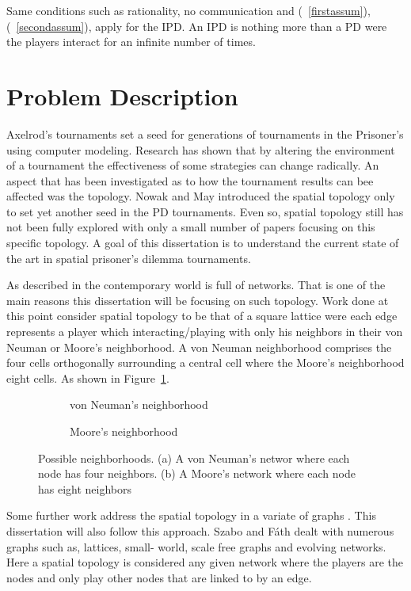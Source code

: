 Same conditions such as rationality, no communication and (~\ref{firstassum}),
(~\ref{secondassum}),
apply for the IPD. An IPD is nothing more than a PD were
the players interact for an infinite number of times.

\section{Problem Description}
Axelrod's tournaments set a seed for generations of tournaments in the
Prisoner's using computer modeling. Research has shown that by altering the
environment of a tournament the effectiveness of some strategies can change
radically. An aspect that has been investigated as to how the tournament results
can bee affected was the topology. Nowak and May \cite{Nowak1992} introduced the spatial topology
only to set yet another seed in the PD tournaments. Even so, spatial topology
still has not been fully explored with only a small number of papers focusing on
this specific topology.  A goal of this dissertation is to understand the
current state of the art in spatial prisoner’s dilemma tournaments.

As described in \cite{MacLane1971} the contemporary world is full of networks. That
is one of the main reasons this dissertation will be focusing on such topology.
Work done at this point consider spatial topology to be that of a square lattice
were each edge represents a player which interacting/playing with only his
neighbors in their von Neuman or Moore's neighborhood. A von Neuman neighborhood
comprises the four cells orthogonally surrounding a central cell where the
Moore's neighborhood eight cells. As shown in Figure~\ref{fig:neighborhood}.

\begin{figure}[!hbtp]
	\centering
	\begin{subfigure}[h]{0.45\textwidth}
		\centering
		
		\caption{von Neuman's neighborhood}
	\end{subfigure}
	\hfill
	\begin{subfigure}[h]{0.52\textwidth}\centering
		\centering
		
		\caption{Moore's neighborhood}
	\end{subfigure}
  \caption{Possible neighborhoods. (a) A von Neuman's networ where each node has four neighbors.
  (b) A Moore's network where each node has eight neighbors}
  \label{fig:neighborhood}
\end{figure}

Some further work address the spatial topology in a variate of graphs
\cite{Dresher1992a, Szabo2007, Lutz2013, Meng2015}.
This dissertation will also follow this approach. Szabo and Fáth dealt with
numerous graphs such as, lattices, small- world, scale free graphs and evolving
networks. Here a spatial topology is considered any given network where the
players are the nodes and only play other nodes that are linked to by
an edge.

